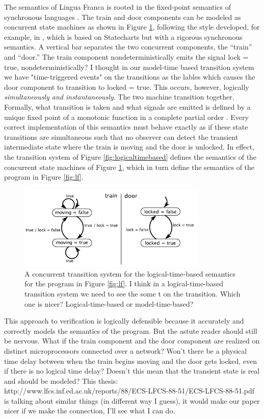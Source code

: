 \documentclass{article}
\newcommand{\Marjan}[1]{{\color{darkgreen}\textbf{} #1}}
\begin{document}
The semantics of Lingua Franca is rooted in the fixed-point semantics of synchronous languages
\cite{FIXME}. The train and door components can be modeled as concurrent state machines
as shown in Figure \ref{fig:logicaltimebasedconcurrent}, following the style developed,
for example, in \cite{LeeSeshia:11:EmbeddedSystems}, which is based on Statecharts \cite{Harel:87:Statecharts}
but with a rigorous synchronous semantics.
A vertical bar separates the two concurrent components, the ``train'' and ``door.''
The train component nondeterministically emits the signal lock = true, \Marjan{nondeterministically? I thought in our model-time based transition system we have "time-triggered events" on the transitions as the lables } which causes the door
component to transition to locked = true.
This occurs, however, logically \emph{simultaneously and instantaneously}.
The two machine transition together.
Formally, what transition is taken and what signals are emitted is defined
by a unique fixed point of a monotonic function in a complete partial order \cite{FIXME}.
Every correct implementation of this semantics must behave exactly as if these state transitions
are simultaneous such that no observer can detect the transient intermediate
state where the train is moving and the door is unlocked.
In effect, the transition system of Figure \ref{fig:logicaltimebased} defines
the semantics of the concurrent state machines of Figure \ref{fig:logicaltimebasedconcurrent},
which in turn define the semantics of the program in Figure \ref{fig:lf}.

\begin{figure}[b]
  \centering
  \includegraphics[width=9cm]{LogicalTimeBasedConcurrent.pdf}
  \caption{A concurrent transition system for the logical-time-based semantics for the program in Figure \ref{fig:lf}. \Marjan{ I think in a logical-time-based transition system we need to see the some t on the transition. Which one is nicer? Logical-time-based or model-time-based?}}
  \label{fig:logicaltimebasedconcurrent}
\end{figure}

This approach to verification is logically defensible because it accurately and correctly
models the semantics of the program.
But the astute reader should still be nervous.
What if the train component and the door component are realized on distinct microprocessors
connected over a network? Won't there be a physical time delay between when the train
begins moving and the door gets locked, even if there is no logical time delay?
Doesn't this mean that the transient state is real and should be modeled?
\Marjan{This thesis: http://www.lfcs.inf.ed.ac.uk/reports/88/ECS-LFCS-88-51/ECS-LFCS-88-51.pdf is talking about similar things (in different way I guess), it would make our paper nicer if we make the connection, I'll see what I can do.}
\end{document}

